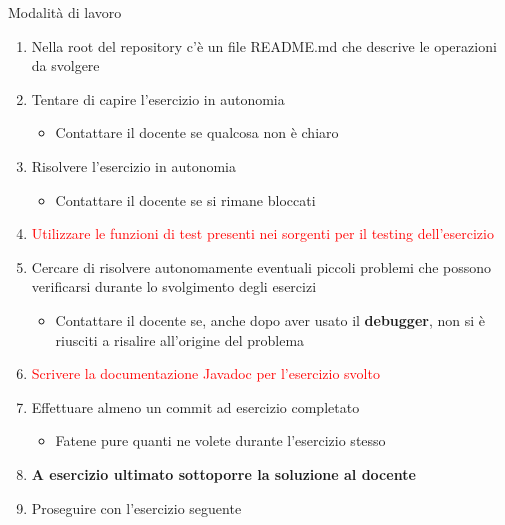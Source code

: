 \documentclass[xcolor=dvipsnames,presentation]{beamer}
\begin{document}
\begin{frame}{Modalità di lavoro}
    \begin{enumerate}
        \item Nella root del repository c'è un file README.md che descrive le operazioni da svolgere
        \item Tentare di capire l'esercizio in autonomia
        \begin{itemize}
            \item Contattare il docente se qualcosa non è chiaro
        \end{itemize}
        \item Risolvere l'esercizio in autonomia
        \begin{itemize}
            \item Contattare il docente se si rimane bloccati
        \end{itemize}
        \item \textcolor{red}{Utilizzare le funzioni di test presenti nei sorgenti per il testing dell'esercizio}
        \item Cercare di risolvere autonomamente eventuali piccoli problemi che possono verificarsi durante lo svolgimento degli esercizi
        \begin{itemize}
            \item Contattare il docente se, anche dopo aver usato il \textbf{debugger}, non si è riusciti a risalire all'origine del problema
        \end{itemize}
        \item \textcolor{red}{Scrivere la documentazione Javadoc per l'esercizio svolto}
        \item Effettuare almeno un commit ad esercizio completato
        \begin{itemize}
            \item Fatene pure quanti ne volete durante l'esercizio stesso
        \end{itemize}
        \item \textbf{A esercizio ultimato sottoporre la soluzione al docente}
        \item Proseguire con l'esercizio seguente
    \end{enumerate}
\end{frame}
\end{document}
